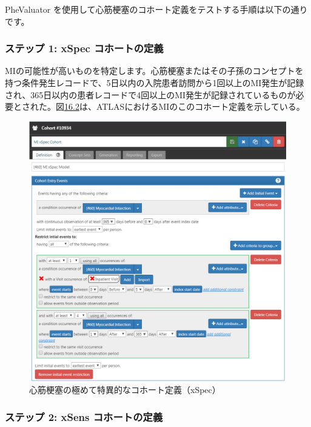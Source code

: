 \documentclass[
  11pt]{book}
\theoremstyle{definition}
\theoremstyle{definition}
\theoremstyle{definition}
\theoremstyle{definition}
\theoremstyle{remark}
\begin{document}
PheValuator を使用して心筋梗塞のコホート定義をテストする手順は以下の通りです。

\subsubsection*{ステップ 1: xSpec コホートの定義}\label{ux30b9ux30c6ux30c3ux30d7-1-xspec-ux30b3ux30dbux30fcux30c8ux306eux5b9aux7fa9}

MIの可能性が高いものを特定します。心筋梗塞またはその子孫のコンセプトを持つ条件発生レコードで、5日以内の入院患者訪問から1回以上のMI発生が記録され、365日以内の患者レコードで4回以上のMI発生が記録されているものが必要とされた。図\href{https://ohdsi.github.io/TheBookOfOhdsi/ClinicalValidity.html\#fig:xSpec}{16.2}は、ATLASにおけるMIのこのコホート定義を示している。

\begin{figure}

{\centering \includegraphics[width=1\linewidth]{images/ClinicalValidity/xSpec} 

}

\caption{心筋梗塞の極めて特異的なコホート定義（xSpec）}\label{fig:xSpec}
\end{figure}

\subsubsection*{ステップ 2: xSens コホートの定義}\label{ux30b9ux30c6ux30c3ux30d7-2-xsens-ux30b3ux30dbux30fcux30c8ux306eux5b9aux7fa9}
\end{document}
